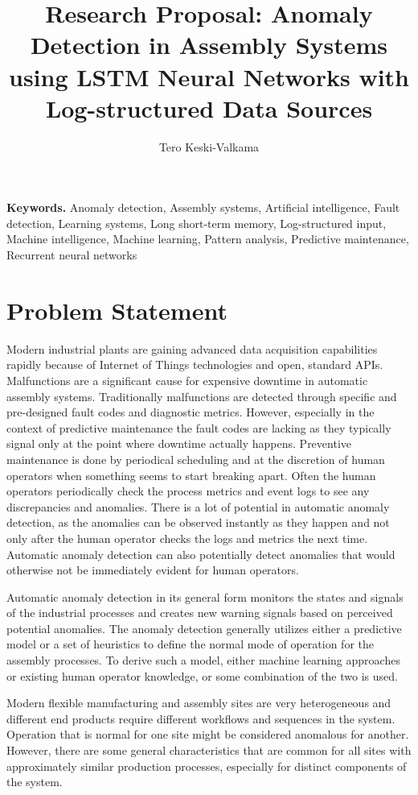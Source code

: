 \documentclass[a4paper,10pt]{article}
\title{Research Proposal: Anomaly Detection in Assembly Systems using LSTM Neural Networks with Log-structured Data Sources}
\author{Tero Keski-Valkama}
\begin{document}
\maketitle

\smallskip
\noindent \textbf{Keywords.} Anomaly detection, Assembly systems, Artificial intelligence, Fault detection, Learning systems, Long short-term memory,
Log-structured input, Machine intelligence, Machine learning, Pattern analysis, Predictive maintenance, Recurrent neural networks

\section{Problem Statement}

Modern industrial plants are gaining advanced data acquisition capabilities rapidly because of Internet of Things technologies and open, standard APIs.
Malfunctions are a significant cause for expensive downtime in automatic assembly systems. Traditionally malfunctions are detected through specific and pre-designed fault codes
and diagnostic metrics. However, especially in the context of predictive maintenance the fault codes are lacking as they typically signal only at the point where downtime
actually happens. Preventive maintenance is done by periodical scheduling and at the discretion of human operators when something seems to start breaking apart.
Often the human operators periodically check the process metrics and event logs to see any discrepancies and anomalies. There is a lot of potential in automatic anomaly
detection, as the anomalies can be observed instantly as they happen and not only after the human operator checks the logs and metrics the next time. Automatic
anomaly detection can also potentially detect anomalies that would otherwise not be immediately evident for human operators.

Automatic anomaly detection in its general form monitors the states and signals of the industrial processes and creates new warning signals based on perceived potential anomalies.
The anomaly detection generally utilizes either a predictive model or a set of heuristics to define the normal mode of operation for the assembly processes. To derive such a model,
either machine learning approaches or existing human operator knowledge, or some combination of the two is used.

Modern flexible manufacturing and assembly sites are very heterogeneous and different end products require different workflows and sequences in the system. Operation that is normal
for one site might be considered anomalous for another. However, there are some general characteristics that are common for all sites with approximately similar
production processes, especially for distinct components of the system.
\end{document}

